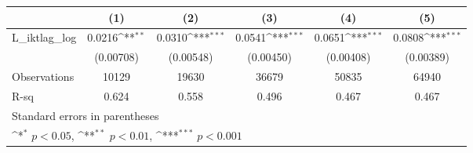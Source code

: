 {
\def\sym#1{\ifmmode^{#1}\else\(^{#1}\)\fi}
\begin{tabular}{l*{5}{c}}
\hline\hline
                &\multicolumn{1}{c}{(1)}         &\multicolumn{1}{c}{(2)}         &\multicolumn{1}{c}{(3)}         &\multicolumn{1}{c}{(4)}         &\multicolumn{1}{c}{(5)}         \\
\hline
L\_iktlag\_log    &   0.0216\sym{**} &   0.0310\sym{***}&   0.0541\sym{***}&   0.0651\sym{***}&   0.0808\sym{***}\\
                &(0.00708)         &(0.00548)         &(0.00450)         &(0.00408)         &(0.00389)         \\
\hline
Observations    &    10129         &    19630         &    36679         &    50835         &    64940         \\
R-sq            &    0.624         &    0.558         &    0.496         &    0.467         &    0.467         \\
\hline\hline
\multicolumn{6}{l}{\footnotesize Standard errors in parentheses}\\
\multicolumn{6}{l}{\footnotesize \sym{*} \(p<0.05\), \sym{**} \(p<0.01\), \sym{***} \(p<0.001\)}\\
\end{tabular}
}

